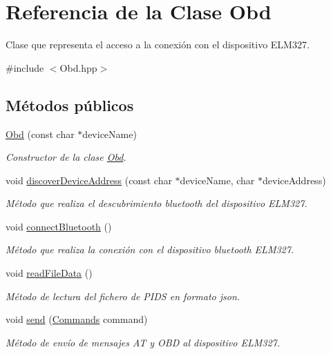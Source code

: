 \hypertarget{classObd}{}\section{Referencia de la Clase Obd}
\label{classObd}


Clase que representa el acceso a la conexión con el dispositivo E\+L\+M327.  




{\ttfamily \#include $<$Obd.\+hpp$>$}

\subsection*{Métodos públicos}
\begin{DoxyCompactItemize}
\item 
\hyperlink{classObd_abd8375cee2ad218a9ae8b464d7b1d63f}{Obd} (const char $\ast$device\+Name)
\begin{DoxyCompactList}\small\item\em Constructor de la clase \hyperlink{classObd}{Obd}. \end{DoxyCompactList}\item 
void \hyperlink{classObd_a59676f3fa1fd3052216b55be0a79c474}{discover\+Device\+Address} (const char $\ast$device\+Name, char $\ast$device\+Address)
\begin{DoxyCompactList}\small\item\em Método que realiza el descubrimiento bluetooth del dispositivo E\+L\+M327. \end{DoxyCompactList}\item 
void \hyperlink{classObd_a104ccc3f2e0a4a103ae4cd1daa2f64d8}{connect\+Bluetooth} ()
\begin{DoxyCompactList}\small\item\em Método que realiza la conexión con el dispositivo bluetooth E\+L\+M327. \end{DoxyCompactList}\item 
void \hyperlink{classObd_a2b8bd75834351a2205d53aec8b3747be}{read\+File\+Data} ()
\begin{DoxyCompactList}\small\item\em Método de lectura del fichero de P\+I\+DS en formato json. \end{DoxyCompactList}\item 
void \hyperlink{classObd_a453591bc9a280e8d44d82025ce8590e9}{send} (\hyperlink{classCommands}{Commands} command)
\begin{DoxyCompactList}\small\item\em Método de envío de mensajes AT y O\+BD al dispositivo E\+L\+M327. \end{DoxyCompactList}\item 

\end{DoxyCompactItemize}
